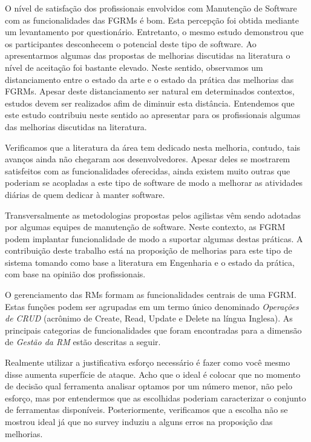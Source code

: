 O nível de satisfação dos profissionais envolvidos com Manutenção de Software
com as funcionalidades das FGRMs é bom. Esta percepção foi obtida mediante um
levantamento por questionário. Entretanto, o mesmo estudo demonstrou que os
participantes desconhecem o potencial deste tipo de software. Ao apresentarmos
algumas das propostas de melhorias discutidas na literatura o nível de aceitação
foi bastante elevado. Neste sentido, observamos um distanciamento entre o estado
da arte e o estado da prática das melhorias das FGRMs. Apesar deste
distanciamento ser natural em determinados contextos, estudos devem ser
realizados afim de diminuir esta distância. Entendemos que este estudo
contribuiu neste sentido ao apresentar para os profissionais algumas das
melhorias discutidas na literatura.

Verificamos que a literatura da área tem dedicado nesta melhoria, contudo, tais
avanços ainda não chegaram aos desenvolvedores. Apesar deles se mostrarem
satisfeitos com as funcionalidades oferecidas, ainda existem muito outras que
poderiam se acopladas a este tipo de software de modo a melhorar as atividades
diárias de quem dedicar à manter software.

Transversalmente as metodologias propostas pelos agilistas vêm sendo adotadas
por algumas equipes de manutenção de software. Neste contexto, as FGRM podem
implantar funcionalidade de modo a suportar algumas destas práticas. A
contribuição deste trabalho está na proposição de melhorias para este tipo de
sistema tomando como base a literatura em Engenharia e o estado da prática, com
base na opinião dos profissionais.

O gerenciamento das RMs formam as funcionalidades centrais de uma FGRM\@. Estas
funções podem ser agrupadas em um termo único denominado \textit{Operações de
    CRUD} (acrônimo de Create, Read, Update e Delete na língua Inglesa). As
principais categorias de funcionalidades que foram encontradas para a dimensão
de \textit{Gestão da RM} estão descritas a seguir.

Realmente utilizar a justificativa esforço necessário é fazer como você mesmo
disse aumenta superfície de ataque. Acho que o ideal é colocar que no momento de
decisão qual ferramenta analisar optamos por um número menor, não pelo esforço,
mas por entendermos que as escolhidas poderiam caracterizar o conjunto de
ferramentas disponíveis. Posteriormente, verificamos que a escolha não se
mostrou ideal já que no survey induziu a alguns erros na proposição das
melhorias.
